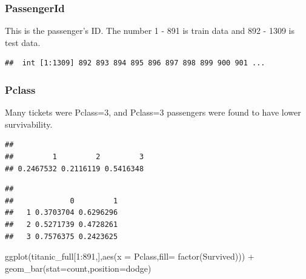 \documentclass[
]{article}
\newenvironment{Shaded}{\begin{snugshade}}{\end{snugshade}}
\newcommand{\AttributeTok}[1]{\textcolor[rgb]{0.77,0.63,0.00}{#1}}
\newcommand{\DecValTok}[1]{\textcolor[rgb]{0.00,0.00,0.81}{#1}}
\newcommand{\FunctionTok}[1]{\textcolor[rgb]{0.00,0.00,0.00}{#1}}
\newcommand{\NormalTok}[1]{#1}
\newcommand{\SpecialCharTok}[1]{\textcolor[rgb]{0.00,0.00,0.00}{#1}}
\newcommand{\StringTok}[1]{\textcolor[rgb]{0.31,0.60,0.02}{#1}}
\begin{document}
\hypertarget{passengerid}{%
\subsubsection{\texorpdfstring{\textbf{PassengerId}}{PassengerId}}\label{passengerid}}

This is the passenger's ID. The number 1 - 891 is train data and 892 -
1309 is test data.

\begin{verbatim}
##  int [1:1309] 892 893 894 895 896 897 898 899 900 901 ...
\end{verbatim}

\hypertarget{pclass}{%
\subsubsection{\texorpdfstring{\textbf{Pclass}}{Pclass}}\label{pclass}}

Many tickets were Pclass=3, and Pclass=3 passengers were found to have
lower survivability.

\begin{Shaded}
\end{Shaded}

\begin{verbatim}
## 
##         1         2         3 
## 0.2467532 0.2116119 0.5416348
\end{verbatim}

\begin{Shaded}
\end{Shaded}

\begin{verbatim}
##    
##             0         1
##   1 0.3703704 0.6296296
##   2 0.5271739 0.4728261
##   3 0.7576375 0.2423625
\end{verbatim}

\begin{Shaded}
\begin{Highlighting}[]
\FunctionTok{ggplot}\NormalTok{(titanic\_full[}\DecValTok{1}\SpecialCharTok{:}\DecValTok{891}\NormalTok{,],}\FunctionTok{aes}\NormalTok{(}\AttributeTok{x =}\NormalTok{ Pclass,}\AttributeTok{fill=} \FunctionTok{factor}\NormalTok{(Survived))) }\SpecialCharTok{+}
  \FunctionTok{geom\_bar}\NormalTok{(}\AttributeTok{stat=}\StringTok{\textquotesingle{}count\textquotesingle{}}\NormalTok{,}\AttributeTok{position=}\StringTok{\textquotesingle{}dodge\textquotesingle{}}\NormalTok{) }
\end{Highlighting}
\end{Shaded}
\end{document}
